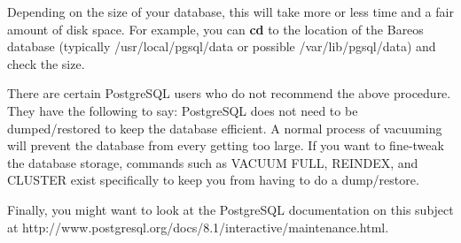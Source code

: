 Depending on the size of your database, this will take more or less time and a
fair amount of disk space. For example, you can {\bf cd} to the location of
the Bareos database (typically /usr/local/pgsql/data or possible
/var/lib/pgsql/data) and check the size.

There are certain PostgreSQL users who do not recommend the above
procedure. They have the following to say:
PostgreSQL does not
need to be dumped/restored to keep the database efficient.  A normal
process of vacuuming will prevent the database from every getting too
large.  If you want to fine-tweak the database storage, commands such
as VACUUM FULL, REINDEX, and CLUSTER exist specifically to keep you
from having to do a dump/restore.

Finally, you might want to look at the PostgreSQL documentation on
this subject at
{http://www.postgresql.org/docs/8.1/interactive/maintenance.html}.



